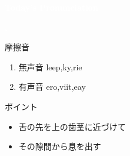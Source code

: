 \documentclass[aspectratio=169,xcolor={dvipsnames,table}]{beamer}
\begin{document}
\begin{frame}
\centering
  \textcolor{white}{\Huge\bfseries Today's Pronunciation}\pause

 \vspace{30pt}

  \textcolor{white}{\Huge\bfseries {}, }
\end{frame}
 \begin{frame}[plain]{摩擦音}

\large

\begin{enumerate}
 \item  無声音 \hspace{20pt}leep,\hspace{1\zw}ky,\hspace{1\zw}rie
 \item  有声音 \hspace{20pt}ero,\hspace{1\zw}viit,\hspace{1\zw}eay
\end{enumerate}

\vspace*{20pt}

\normalsize
ポイント

\begin{itemize}
 \item 舌の先を上の歯茎に近づけて
 \item その隙間から息を出す
 
\end{itemize}
\hfill{}
\end{frame}
\end{document}
